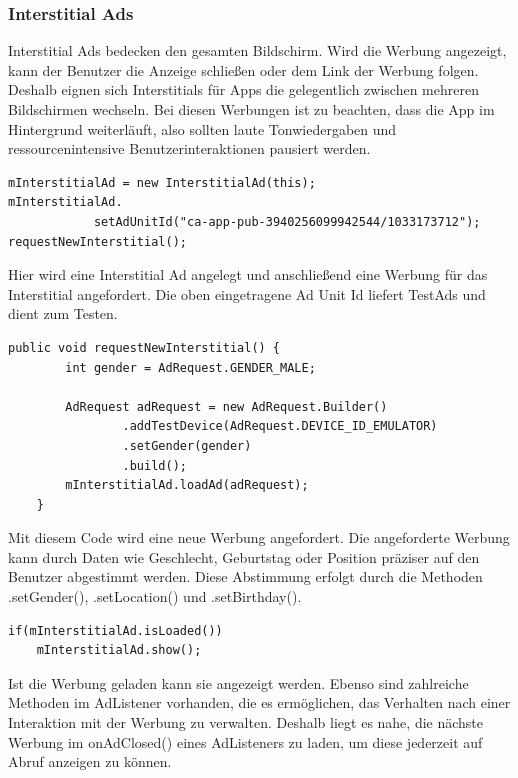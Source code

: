 \documentclass[FIPLY_base.tex]{subfiles}
\begin{document}
\subsubsection{Interstitial Ads}
Interstitial Ads bedecken den gesamten Bildschirm. Wird die Werbung angezeigt, kann der Benutzer die Anzeige schließen oder dem Link der Werbung folgen.
Deshalb eignen sich Interstitials für Apps die gelegentlich zwischen mehreren Bildschirmen wechseln.
Bei diesen Werbungen ist zu beachten, dass die App im Hintergrund weiterläuft, also sollten laute Tonwiedergaben und ressourcenintensive Benutzerinteraktionen pausiert werden. 
\begin{lstlisting}[caption={Erstellen und Anfordern einer Interstitial Ad},label=DescriptiveLabel]
mInterstitialAd = new InterstitialAd(this);
mInterstitialAd.
       		setAdUnitId("ca-app-pub-3940256099942544/1033173712");
requestNewInterstitial();
\end{lstlisting}
Hier wird eine Interstitial Ad angelegt und anschließend eine Werbung für das Interstitial angefordert. 
Die oben eingetragene Ad Unit Id liefert TestAds und dient zum Testen.
\begin{lstlisting}[caption={Die requestNewInterstitial()-Methode},label=DescriptiveLabel]
public void requestNewInterstitial() {
        int gender = AdRequest.GENDER_MALE;
        
        AdRequest adRequest = new AdRequest.Builder()
                .addTestDevice(AdRequest.DEVICE_ID_EMULATOR)
                .setGender(gender)
                .build();
        mInterstitialAd.loadAd(adRequest);
    }
\end{lstlisting}
Mit diesem Code wird eine neue Werbung angefordert. Die angeforderte Werbung kann durch Daten wie Geschlecht, Geburtstag oder Position präziser auf den Benutzer abgestimmt werden.
Diese Abstimmung erfolgt durch die Methoden .setGender(), .setLocation() und .setBirthday().	
\ \\
\begin{lstlisting}[caption={Das Anzeigen einer Interstitial Ad, sobald sie geladen ist},label=DescriptiveLabel]
if(mInterstitialAd.isLoaded()) 
    mInterstitialAd.show();
\end{lstlisting}
Ist die Werbung geladen kann sie angezeigt werden.
Ebenso sind zahlreiche Methoden im AdListener vorhanden, die es ermöglichen, das Verhalten nach einer Interaktion mit der Werbung zu verwalten.
Deshalb liegt es nahe, die nächste Werbung im onAdClosed() eines AdListeners zu laden, um diese jederzeit auf Abruf anzeigen zu können.
\end{document}
